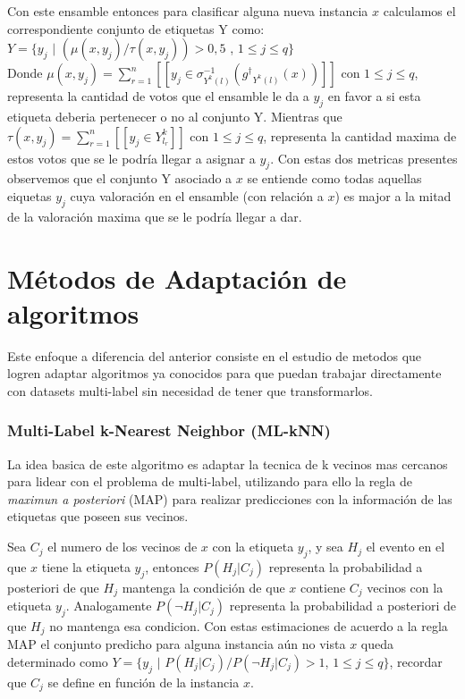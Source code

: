 \documentclass{article}
\begin{document}
        Con este ensamble entonces para clasificar alguna nueva instancia $x$ calculamos el correspondiente conjunto de etiquetas Y como:\\
        
        $Y = \{y_j$ $|$ $(\mu(x, y_j) / \tau(x, y_j)) > 0,5$ , $1\leq j\leq q \}$\\
        
        Donde $\mu(x, y_j) = \sum_{r=1}^{n}[[ y_j \in \sigma^{-1}_{Y^{k} (l)} ({g^\dagger}_{Y^{k} (l)} (x)) ]]$ con $1\leq j\leq q$, representa la cantidad de votos que el ensamble le da a $y_j$ en favor a si esta etiqueta deberia pertenecer o no al conjunto Y. Mientras que $\tau(x, y_j) = \sum_{r=1}^{n}[[ y_j \in Y^{k}_{l_r} ]]$ con $1\leq j\leq q$, representa la cantidad maxima de estos votos que se le podría llegar a asignar a $y_j$. Con estas dos metricas presentes observemos que el conjunto Y asociado a $x$ se entiende como todas aquellas eiquetas $y_j$ cuya valoración en el ensamble (con relación a $x$) es major a la mitad de la valoración maxima que se le podría llegar a dar.
        
    \section{M\'etodos de Adaptaci\'on de algoritmos}
    
        Este enfoque a diferencia del anterior consiste en el estudio de metodos que logren adaptar algoritmos ya conocidos para que puedan trabajar directamente con datasets multi-label sin necesidad de tener que transformarlos.
    
        \subsubsection{Multi-Label k-Nearest Neighbor (ML-kNN)}
        La idea basica de este algoritmo es adaptar la tecnica de k vecinos mas cercanos para lidear con el problema de multi-label, utilizando para ello la regla de \textit{maximun a posteriori} (MAP) para realizar predicciones con la información de las etiquetas que poseen sus vecinos. 
        
        Sea $C_j$ el numero de los vecinos de $x$ con la etiqueta $y_j$, y sea $H_j$ el evento en el que $x$ tiene la etiqueta $y_j$, entonces $P(H_j |C_j)$ representa la probabilidad a posteriori de que $H_j$ mantenga la condición de que $x$ contiene $C_j$ vecinos con la etiqueta $y_j$. Analogamente $P(\neg H_j |C_j)$ representa la probabilidad a posteriori de que $H_j$ no mantenga esa condicion. Con estas estimaciones de acuerdo a la regla MAP el conjunto predicho para alguna instancia aún no vista $x$ queda determinado como $Y = \{y_j$ $|$  $P(H_j |C_j) / P(\neg H_j |C_j) > 1$, $1\leq j \leq q\}$, recordar que $C_j$ se define en función de la instancia $x$.
        
\end{document}
